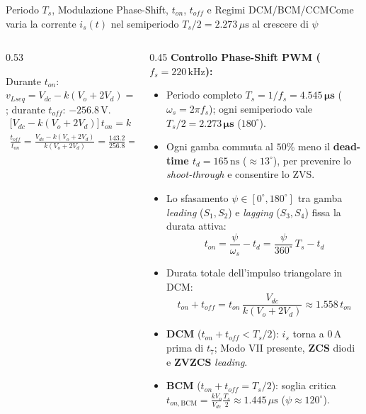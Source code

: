 \documentclass[aspectratio=169,9pt]{beamer}
\newcommand{\V}{\,\text{V}}
\newcommand{\A}{\,\text{A}}
\newcommand{\kHz}{\,\text{kHz}}
\newcommand{\ns}{\,\text{ns}}
\newcommand{\us}{\,\mu\text{s}}
\begin{document}
\begin{frame}{Periodo $T_s$, Modulazione Phase-Shift, $t_{on}$, $t_{off}$ e Regimi DCM/BCM/CCM}{Come varia la corrente $i_s(t)$ nel semiperiodo $T_s/2 = 2.273\us$ al crescere di $\psi$}
\begin{columns}[T,onlytextwidth]
\begin{column}{0.53\textwidth}
      \vspace*{1.5mm}
      \begin{formulabox}[title={Bilancio Volt-Secondi su $L_{seq}$ e rapporto $t_{off}/t_{on}$}]
        Durante $t_{on}$: $v_{Lseq} = V_{dc} - k(V_o+2V_d) = +143.2\V$; durante $t_{off}$: $-256.8\V$.
        \begin{gather*}
          \bigl[V_{dc}-k(V_o+2V_d)\bigr]\,t_{on} = k(V_o+2V_d)\,t_{off} \\
          \frac{t_{off}}{t_{on}} = \frac{V_{dc}-k(V_o+2V_d)}{k(V_o+2V_d)} = \frac{143.2}{256.8} = \mathbf{0.558}
        \end{gather*}
      \end{formulabox}
    \end{column}
    \begin{column}{0.45\textwidth}
      \scriptsize
      \textbf{\color{PrimaryBlue}Controllo Phase-Shift PWM ($f_s = 220\kHz$):}
      \begin{itemize}\setlength{\itemsep}{2pt}
        \item Periodo completo $T_s = 1/f_s = \mathbf{4.545\us}$ ($\omega_s = 2\pi f_s$); ogni semiperiodo vale $T_s/2 = \mathbf{2.273\us}$ ($180^\circ$).
        \item Ogni gamba commuta al $50\%$ meno il \textbf{dead-time $t_d = 165\ns$} ($\approx 13^\circ$), per prevenire lo \emph{shoot-through} e consentire lo ZVS.
        \item Lo sfasamento $\psi \in [0^\circ, 180^\circ]$ tra gamba \emph{leading} ($S_1, S_2$) e \emph{lagging} ($S_3, S_4$) fissa la durata attiva:
          \[
            t_{on} = \frac{\psi}{\omega_s} - t_d = \frac{\psi}{360^\circ}\,T_s - t_d
          \]
        \item Durata totale dell'impulso triangolare in DCM:
          \[
            t_{on} + t_{off} = t_{on}\,\frac{V_{dc}}{k(V_o+2V_d)} \approx 1.558\,t_{on}
          \]
      \end{itemize}
      \vspace*{1mm}
      \begin{okbox}[title={I 3 Regimi di Conduzione}]
        \begin{itemize}\setlength{\itemsep}{1.2pt}
          \item \textbf{DCM} ($t_{on}+t_{off} < T_s/2$): $i_s$ torna a $0\A$ prima di $t_7$; Modo VII presente, \textbf{ZCS} diodi e \textbf{ZVZCS} \emph{leading}.
          \item \textbf{BCM} ($t_{on}+t_{off} = T_s/2$): soglia critica $t_{on,\text{BCM}}=\frac{kV_o}{V_{dc}}\frac{T_s}{2}\approx 1.445\us$ ($\psi\approx 120^\circ$).

\end{itemize}
\end{okbox}
\end{column}
\end{columns}
\end{frame}
\end{document}
